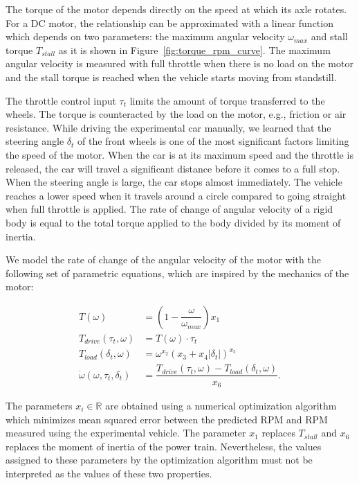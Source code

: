 The torque of the motor depends directly on the speed at which its axle rotates. For a DC motor, the relationship can be approximated with a linear function which depends on two parameters: the maximum angular velocity $\omega_{max}$ and stall torque $T_{stall}$ as it is shown in Figure~\ref{fig:torque_rpm_curve}. The maximum angular velocity is measured with full throttle when there is no load on the motor and the stall torque is reached when the vehicle starts moving from standstill.

The throttle control input $\tau_t$ limits the amount of torque transferred to the wheels. The torque is counteracted by the load on the motor, e.g., friction or air resistance. While driving the experimental car manually, we learned that the steering angle $\delta_t$ of the front wheels is one of the most significant factors limiting the speed of the motor. When the car is at its maximum speed and the throttle is released, the car will travel a significant distance before it comes to a full stop. When the steering angle is large, the car stops almost immediately. The vehicle reaches a lower speed when it travels around a circle compared to going straight when full throttle is applied. The rate of change of angular velocity of a rigid body is equal to the total torque applied to the body divided by its moment of inertia.

We model the rate of change of the angular velocity of the motor with the following set of parametric equations, which are inspired by the mechanics of the motor:

\begin{equation}
\begin{aligned}
\label{eq:motor_model}
T(\omega)&=\left(1 - \dfrac{\omega}{\omega_{max}}\right)x_1 \\
T_{drive}(\tau_t, \omega)&=T(\omega)\cdot \tau_t \\
T_{load}(\delta_t, \omega)&=\omega^{x_2} \left(x_3 + x_4|\delta_t|\right)^{x_5} \\
\dot{\omega}(\omega, \tau_t, \delta_t)&=\dfrac{T_{drive}(\tau_t, \omega)-T_{load}(\delta_t, \omega)}{x_6}.
\end{aligned}
\end{equation}

The parameters $x_i\in\mathbb{R}$ are obtained using a numerical optimization algorithm which minimizes mean squared error between the predicted RPM and RPM measured using the experimental vehicle. The parameter $x_1$ replaces $T_{stall}$ and $x_6$ replaces the moment of inertia of the power train. Nevertheless, the values assigned to these parameters by the optimization algorithm must not be interpreted as the values of these two properties.

